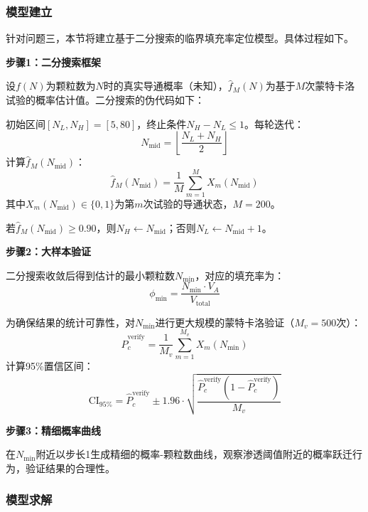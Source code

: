 
\subsubsection{模型建立}

针对问题三，本节将建立基于二分搜索的临界填充率定位模型。具体过程如下。

\textbf{步骤1：二分搜索框架}

设$f(N)$为颗粒数为$N$时的真实导通概率（未知），$\hat{f}_M(N)$为基于$M$次蒙特卡洛试验的概率估计值。二分搜索的伪代码如下：

初始区间$[N_L, N_H] = [5, 80]$，终止条件$N_H - N_L \leq 1$。每轮迭代：
\begin{equation}
N_{\text{mid}} = \left\lfloor \frac{N_L + N_H}{2} \right\rfloor
\end{equation}
计算$\hat{f}_M(N_{\text{mid}})$：
\begin{equation}
\hat{f}_M(N_{\text{mid}}) = \frac{1}{M} \sum_{m=1}^{M} X_m(N_{\text{mid}})
\end{equation}
其中$X_m(N_{\text{mid}}) \in \{0, 1\}$为第$m$次试验的导通状态，$M=200$。

若$\hat{f}_M(N_{\text{mid}}) \geq 0.90$，则$N_H \leftarrow N_{\text{mid}}$；否则$N_L \leftarrow N_{\text{mid}} + 1$。

\textbf{步骤2：大样本验证}

二分搜索收敛后得到估计的最小颗粒数$N_{\min}$，对应的填充率为：
\begin{equation}
\phi_{\min} = \frac{N_{\min} \cdot V_A}{V_{\text{total}}}
\end{equation}

为确保结果的统计可靠性，对$N_{\min}$进行更大规模的蒙特卡洛验证（$M_v = 500$次）：
\begin{equation}
\hat{P}_c^{\text{verify}} = \frac{1}{M_v} \sum_{m=1}^{M_v} X_m(N_{\min})
\end{equation}
计算95\%置信区间：
\begin{equation}
\text{CI}_{95\%} = \hat{P}_c^{\text{verify}} \pm 1.96 \cdot \sqrt{\frac{\hat{P}_c^{\text{verify}}(1 - \hat{P}_c^{\text{verify}})}{M_v}}
\end{equation}

\textbf{步骤3：精细概率曲线}

在$N_{\min}$附近以步长1生成精细的概率-颗粒数曲线，观察渗透阈值附近的概率跃迁行为，验证结果的合理性。

\subsubsection{模型求解}

